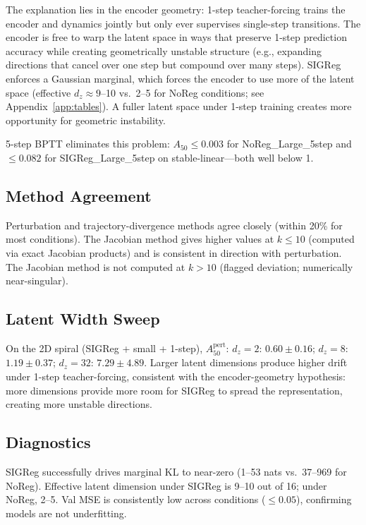 \documentclass{article}
\begin{document}
The explanation lies in the encoder geometry: 1-step teacher-forcing trains the encoder and
dynamics jointly but only ever supervises single-step transitions.
The encoder is free to warp the latent space in ways that preserve 1-step prediction accuracy
while creating geometrically unstable structure (e.g., expanding directions that cancel over one
step but compound over many steps).
SIGReg enforces a Gaussian marginal, which forces the encoder to use more of the latent space
(effective $d_z \approx 9$--10 vs.\ 2--5 for NoReg conditions; see Appendix~\ref{app:tables}).
A fuller latent space under 1-step training creates more opportunity for geometric instability.

5-step BPTT eliminates this problem: $A_{50} \leq 0.003$ for NoReg\_Large\_5step and
$\leq 0.082$ for SIGReg\_Large\_5step on stable-linear---both well below 1.

\subsection{Method Agreement}

Perturbation and trajectory-divergence methods agree closely (within 20\% for most conditions).
The Jacobian method gives higher values at $k \leq 10$ (computed via exact Jacobian products)
and is consistent in direction with perturbation.
The Jacobian method is not computed at $k > 10$ (flagged deviation; numerically near-singular).

\subsection{Latent Width Sweep}

On the 2D spiral (SIGReg + small + 1-step), $A_{50}^{\text{pert}}$:
$d_z{=}2$: $0.60 \pm 0.16$;
$d_z{=}8$: $1.19 \pm 0.37$;
$d_z{=}32$: $7.29 \pm 4.89$.
Larger latent dimensions produce higher drift under 1-step teacher-forcing, consistent with the
encoder-geometry hypothesis: more dimensions provide more room for SIGReg to spread the
representation, creating more unstable directions.

\subsection{Diagnostics}

SIGReg successfully drives marginal KL to near-zero (1--53 nats vs.\ 37--969 for NoReg).
Effective latent dimension under SIGReg is 9--10 out of 16; under NoReg, 2--5.
Val MSE is consistently low across conditions ($\leq 0.05$), confirming models are not underfitting.
\end{document}
